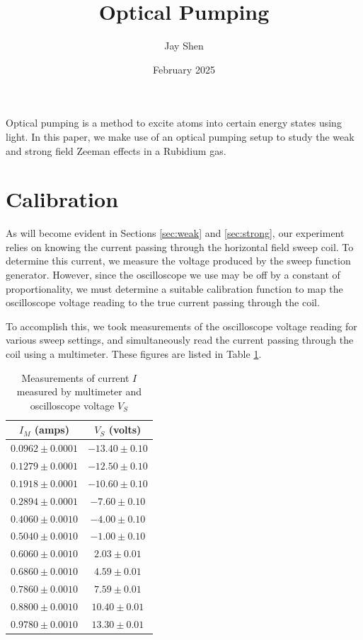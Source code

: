 \documentclass[12pt, letterpaper]{article}
\title{Optical Pumping}
\author{Jay Shen}
\date{February 2025}
\begin{document}
\maketitle

Optical pumping is a method to excite atoms into certain energy states using light. In this paper, we make use of an optical pumping setup to study the weak and strong field Zeeman effects in a Rubidium gas. 

\section{Calibration} \label{sec:calibration}

As will become evident in Sections \ref{sec:weak} and \ref{sec:strong}, our experiment relies on knowing the current passing through the horizontal field sweep coil. To determine this current, we measure the voltage produced by the sweep function generator. However, since the oscilloscope we use may be off by a constant of proportionality, we must determine a suitable calibration function to map the oscilloscope voltage reading to the true current passing through the coil. 

To accomplish this, we took measurements of the oscilloscope voltage reading for various sweep settings, and simultaneously read the current passing through the coil using a multimeter. These figures are listed in Table \ref{tab:calibration}. 

\begin{table}[!h]
    \centering
    \begin{tabular}{| c | c |}
        \hline
        $I_M$ (amps) &  $V_S$ (volts) \\
        \hline
        $0.0962 \pm 0.0001$ & $-13.40 \pm 0.10$ \\
        $0.1279 \pm 0.0001$ & $-12.50 \pm 0.10$ \\
        $0.1918 \pm 0.0001$ & $-10.60 \pm 0.10$ \\
        $0.2894 \pm 0.0001$ & $-7.60 \pm 0.10$ \\
        $0.4060 \pm 0.0010$ & $-4.00 \pm 0.10$ \\
        $0.5040 \pm 0.0010$ & $-1.00 \pm 0.10$ \\
        $0.6060 \pm 0.0010$ & $2.03 \pm 0.01$ \\
        $0.6860 \pm 0.0010$ & $4.59 \pm 0.01$ \\
        $0.7860 \pm 0.0010$ & $7.59 \pm 0.01$ \\
        $0.8800 \pm 0.0010$ & $10.40 \pm 0.01$ \\
        $0.9780 \pm 0.0010$ & $13.30 \pm 0.01$ \\
        \hline
    \end{tabular}
    \caption{Measurements of current $I$ measured by multimeter and oscilloscope voltage $V_S$}
    \label{tab:calibration}
\end{table}
\end{document}
